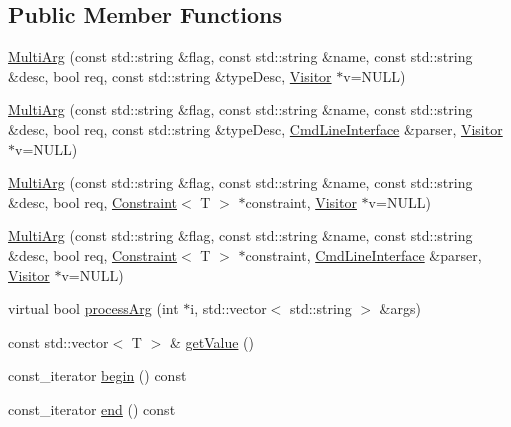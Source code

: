 \subsection*{Public Member Functions}
\begin{DoxyCompactItemize}
\item 
\hyperlink{class_t_c_l_a_p_1_1_multi_arg_a49b5437c7f06cd6864c07dc59814a953}{Multi\+Arg} (const std\+::string \&flag, const std\+::string \&name, const std\+::string \&desc, bool req, const std\+::string \&type\+Desc, \hyperlink{class_t_c_l_a_p_1_1_visitor}{Visitor} $\ast$v=N\+U\+L\+L)
\item 
\hyperlink{class_t_c_l_a_p_1_1_multi_arg_a48c90a873389280f72fb5d6ef707b400}{Multi\+Arg} (const std\+::string \&flag, const std\+::string \&name, const std\+::string \&desc, bool req, const std\+::string \&type\+Desc, \hyperlink{class_t_c_l_a_p_1_1_cmd_line_interface}{Cmd\+Line\+Interface} \&parser, \hyperlink{class_t_c_l_a_p_1_1_visitor}{Visitor} $\ast$v=N\+U\+L\+L)
\item 
\hyperlink{class_t_c_l_a_p_1_1_multi_arg_a38b1e32a8189356bd1e5ec7c2d43c1a3}{Multi\+Arg} (const std\+::string \&flag, const std\+::string \&name, const std\+::string \&desc, bool req, \hyperlink{class_t_c_l_a_p_1_1_constraint}{Constraint}$<$ T $>$ $\ast$constraint, \hyperlink{class_t_c_l_a_p_1_1_visitor}{Visitor} $\ast$v=N\+U\+L\+L)
\item 
\hyperlink{class_t_c_l_a_p_1_1_multi_arg_ad4fcd892de2f1ef275c30dc499215208}{Multi\+Arg} (const std\+::string \&flag, const std\+::string \&name, const std\+::string \&desc, bool req, \hyperlink{class_t_c_l_a_p_1_1_constraint}{Constraint}$<$ T $>$ $\ast$constraint, \hyperlink{class_t_c_l_a_p_1_1_cmd_line_interface}{Cmd\+Line\+Interface} \&parser, \hyperlink{class_t_c_l_a_p_1_1_visitor}{Visitor} $\ast$v=N\+U\+L\+L)
\item 
virtual bool \hyperlink{class_t_c_l_a_p_1_1_multi_arg_a344d3cf2128c510f92825e421ea667c7}{process\+Arg} (int $\ast$i, std\+::vector$<$ std\+::string $>$ \&args)
\item 
const std\+::vector$<$ T $>$ \& \hyperlink{class_t_c_l_a_p_1_1_multi_arg_aff4ff7f8d854dd668aaaf80511d8002b}{get\+Value} ()
\item 
const\+\_\+iterator \hyperlink{class_t_c_l_a_p_1_1_multi_arg_a48058500cdc9ef8b9c2c9e6394ab499d}{begin} () const 
\item 
const\+\_\+iterator \hyperlink{class_t_c_l_a_p_1_1_multi_arg_ac30e414b799158ff6710fb1e7ce83aee}{end} () const 
\item 

\end{DoxyCompactItemize}
